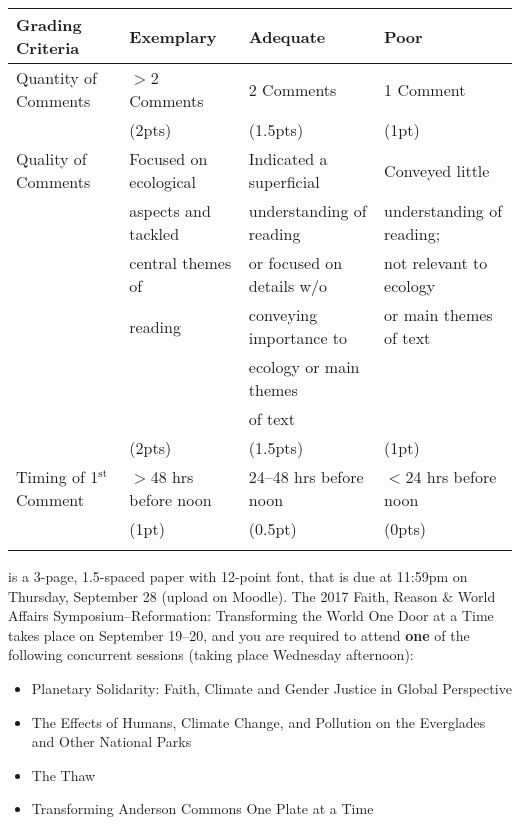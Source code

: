 \documentclass{tufte-handout}
\begin{document}
\begin{fullwidth}
\begin{tabular}{l l l l}
\\
\hline
\textbf{Grading Criteria} & \textbf{Exemplary} & \textbf{Adequate} & \textbf{Poor} \\
\hline
Quantity of Comments & $>$2 Comments & 2 Comments & 1 Comment \\
& (2pts) & (1.5pts) & (1pt) \\
\hline
Quality of Comments & Focused on ecological & Indicated a superficial & Conveyed little \\
& aspects and tackled & understanding of reading & understanding of reading; \\
& central themes of & or focused on details w/o& not relevant to ecology \\
& reading &  conveying importance to & or main themes of text \\
& & ecology or main themes & \\
& & of text & \\
& (2pts) & (1.5pts) & (1pt) \\
\hline
Timing of 1$^\mathrm{st}$ Comment & $>$48 hrs before noon & 24--48 hrs before noon & $<$24 hrs before noon \\
& (1pt) & (0.5pt) & (0pts) \\
\hline \\
\end{tabular}

 is a 3-page, 1.5-spaced paper with 12-point font, that is due at 
11:59pm on Thursday, September 28 (upload on Moodle). 											%
The 2017 Faith, Reason \& World Affairs Symposium--Reformation: Transforming the World One Door at a Time %
takes place on September 19--20, 													 %
and you are required to attend \textbf{one} of the following concurrent sessions (taking place Wednesday afternoon):

\begin{itemize}
\item Planetary Solidarity: Faith, Climate and Gender Justice in Global Perspective 
\item The Effects of Humans, Climate Change, and Pollution on the Everglades and Other National Parks
\item The Thaw
\item Transforming Anderson Commons One Plate at a Time
\end{itemize}


\end{fullwidth}
\end{document}
